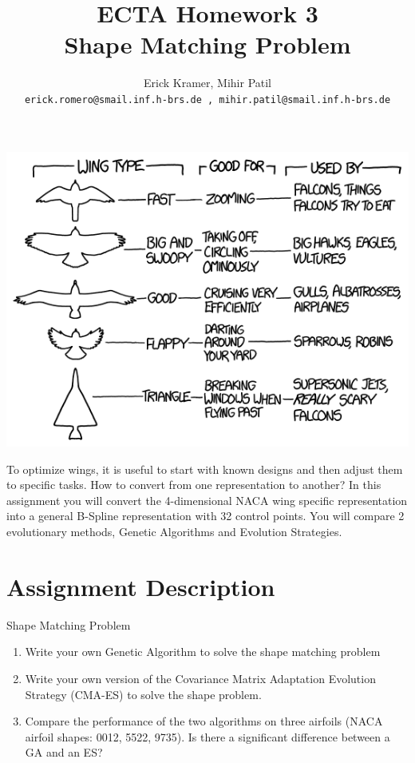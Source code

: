 \documentclass{article}
\title{ECTA Homework 3\\Shape Matching Problem}
\author{\color{blue}Erick Kramer, Mihir Patil\\ \texttt{\color{blue}erick.romero@smail.inf.h-brs.de , mihir.patil@smail.inf.h-brs.de}}
\begin{document}
\maketitle
\begin{center}
	\begin{minipage}{1\linewidth}
		\centering
			\includegraphics[scale=0.6]{img/wingtypes.png}
	\end{minipage}
\end{center}

To optimize wings, it is useful to start with known designs and then adjust them to specific tasks. How to convert from one representation to another? In this assignment you will convert the 4-dimensional NACA wing specific representation into a general B-Spline representation with 32 control points. You will compare 2 evolutionary methods, Genetic Algorithms and Evolution Strategies.

\newpage

\section{Assignment Description}
	Shape Matching Problem
	\begin{enumerate}
		\item Write your own Genetic Algorithm to solve the shape matching problem
		\item Write your own version of the Covariance Matrix Adaptation Evolution Strategy (CMA-ES) to solve the shape problem.
		\item Compare the performance of the two algorithms on three airfoils (NACA airfoil shapes: 0012, 5522, 9735). Is there a significant difference between a GA and an ES? 
	\end{enumerate}
\end{document}
